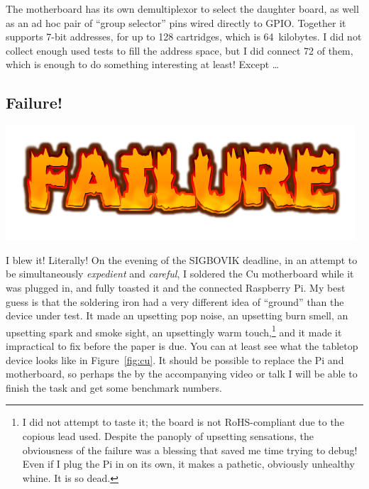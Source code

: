 \documentclass[twocolumn]{article}
\begin{document}
The motherboard has its own demultiplexor to select the daughter
board, as well as an ad hoc pair of ``group selector'' pins wired
directly to GPIO. Together it supports 7-bit addresses, for up
to 128 cartridges, which is 64~kilobytes. I did not collect enough
used tests to fill the address space, but I did connect 72 of them,
which is enough to do something interesting at least! Except \ldots

\subsection{Failure!} \label{sec:failure}
\noindent
\includegraphics[width=\columnwidth]{failure}

I blew it! Literally! On the evening of the SIGBOVIK deadline, in an
attempt to be simultaneously {\em expedient} and {\em careful}, I
soldered the Cu motherboard while it was plugged in, and fully toasted
it and the connected Raspberry Pi. My best guess is that the soldering
iron had a very different idea of ``ground'' than the device under
test. It made an upsetting pop noise, an upsetting burn smell, an
upsetting spark and smoke sight, an upsettingly warm touch,\footnote{
  I did not attempt to taste it; the board is not RoHS-compliant due
  to the copious lead used. Despite the panoply of upsetting
  sensations, the obviousness of the failure was a blessing that saved
  me time trying to debug! Even if I plug the Pi in on its own, it
  makes a pathetic, obviously unhealthy whine. It is so dead.} and it
made it impractical to fix before the paper is due. You can at least
see what the tabletop device looks like in Figure~\ref{fig:cu}. It
should be possible to replace the Pi and motherboard, so perhaps the
by the accompanying video or talk I will be able to finish the task
and get some benchmark numbers.
\end{document}
